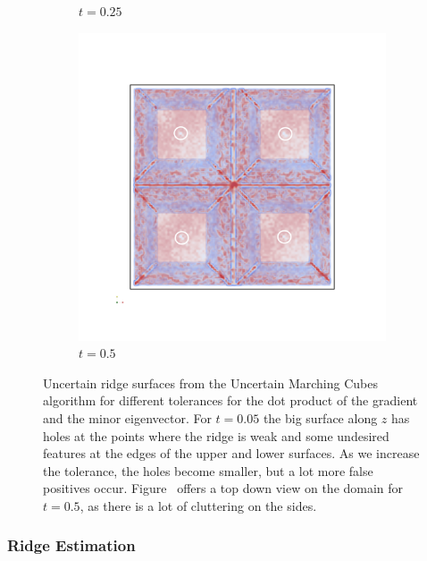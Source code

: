 \begin{figure}[]
\begin{subfigure}[]{0.49\textwidth}
        \caption{$t=0.25$}
        \label{fig:MCridgetol}
    \end{subfigure}
    \begin{subfigure}[]{0.49\textwidth}
        \includegraphics[trim=0 300 0 300, clip=true, width=\textwidth]{Images/MCridgetoltop.png}
        \caption{$t=0.5$}
        \label{fig:MCridgetop}
    \end{subfigure}
    \caption{Uncertain ridge surfaces from the Uncertain Marching Cubes
    algorithm for different tolerances for the dot product of the
    gradient and the minor eigenvector. For $t=0.05$ the big surface
    along $z$ has holes at the points where the ridge is weak and some
    undesired features at the edges of the upper and lower surfaces. As
    we increase the tolerance, the holes become smaller, but a lot more
    false positives occur. Figure~ offers a top
    down view on the domain for $t=0.5$, as there is a lot of cluttering
    on the sides.}
    \label{fig:MCridges}
\end{figure}

\subsubsection{Ridge Estimation}

